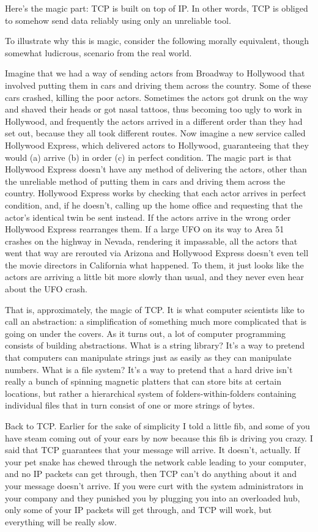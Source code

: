 \documentclass{article}
\begin{document}
Here's the magic part: TCP is built on top of IP. In other words, TCP is obliged to somehow send data reliably using only an unreliable tool.

To illustrate why this is magic, consider the following morally equivalent, though somewhat ludicrous, scenario from the real world.

Imagine that we had a way of sending actors from Broadway to Hollywood that involved putting them in cars and driving them across the country. Some of these cars crashed, killing the poor actors. Sometimes the actors got drunk on the way and shaved their heads or got nasal tattoos, thus becoming too ugly to work in Hollywood, and frequently the actors arrived in a different order than they had set out, because they all took different routes. Now imagine a new service called Hollywood Express, which delivered actors to Hollywood, guaranteeing that they would (a) arrive (b) in order (c) in perfect condition. The magic part is that Hollywood Express doesn't have any method of delivering the actors, other than the unreliable method of putting them in cars and driving them across the country. Hollywood Express works by checking that each actor arrives in perfect condition, and, if he doesn't, calling up the home office and requesting that the actor's identical twin be sent instead. If the actors arrive in the wrong order Hollywood Express rearranges them. If a large UFO on its way to Area 51 crashes on the highway in Nevada, rendering it impassable, all the actors that went that way are rerouted via Arizona and Hollywood Express doesn't even tell the movie directors in California what happened. To them, it just looks like the actors are arriving a little bit more slowly than usual, and they never even hear about the UFO crash.

That is, approximately, the magic of TCP. It is what computer scientists like to call an abstraction: a simplification of something much more complicated that is going on under the covers. As it turns out, a lot of computer programming consists of building abstractions. What is a string library? It's a way to pretend that computers can manipulate strings just as easily as they can manipulate numbers. What is a file system? It's a way to pretend that a hard drive isn't really a bunch of spinning magnetic platters that can store bits at certain locations, but rather a hierarchical system of folders-within-folders containing individual files that in turn consist of one or more strings of bytes.

Back to TCP. Earlier for the sake of simplicity I told a little fib, and some of you have steam coming out of your ears by now because this fib is driving you crazy. I said that TCP guarantees that your message will arrive. It doesn't, actually. If your pet snake has chewed through the network cable leading to your computer, and no IP packets can get through, then TCP can't do anything about it and your message doesn't arrive. If you were curt with the system administrators in your company and they punished you by plugging you into an overloaded hub, only some of your IP packets will get through, and TCP will work, but everything will be really slow.
\end{document}
